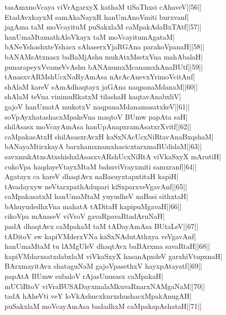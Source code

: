 \documentclass{article}
\begin{document}
tasAmxnoVcaya viVrAgarxyX kathaM tiSaThxsi cAhaveV||56||\\
EtadAvxkayxM samAkaNayxR hanUmAnoVmiti burxvanf|\\
jagAma taM moVcayituM puSakxlaM caMpakAdaBxTAtf||57||\\
hanUmaMtamathAloVkayx taM moVcayitumAgataM|\\
bANeYshashxteYshacx sAhaserxYjaRGAna parakoVpanaH||58||\\
bANAMsAtxnasx baBaMjAshu mukAtxMsetxVna mahAbalaH|\\
punarapeyxVvameVvAshu bANAnumxMcanamxhAnaBUtf||59||\\
tAnasxvARMshUcxNaRyAmAsa nArAcAnevxYrimoVcitAnf|\\
shAlaM kareV sAmAdhaqtayx jaGAna naqpanaMdanaM||60||\\
shAlaM teVna vinimuRkatxM tilashaH kaqtavAnabxliV|\\
gajoV hanUmatA mukotxV naqpanaMdanamasatxkeV||61||\\
soVpAyxhatashacxMpakeVna maqtoV BUmw papAta saH|\\
shilAsasx moVcayAmAsa hanUpAnapxramAsatxrXvitf||62||\\
caMpakasAtxH shilAsasxrAvxH kaSxNAcUcxNiRtavAnaBxqshaM|\\
bANayaMtirxkayA barxhamxnamxhacicxtarxmaBUdidaM||63||\\
savxmukAtxsAtxshishxlAsasxvARshUcxNiRtA viVkaSxyX mArutiH|\\
cukoVpa haqdayeVtayxMtaM bahuviVrayxmiti samxranf||64||\\
Agatayx ca kareV dhaqtAvx naBasuyxtapxtitaH kapiH|\\
tAvadayxyw neVtarxpathAdupari kiSxparxveVgavAnf||65||\\
caMpakasatxM hanUmaMtaM yuyudheV naBasi sithxtaH|\\
bAhuyudedhxVna mahatA tADitaH kapipuMgavaH||66||\\
cikoVpa mAnaseV viVroV gavaRpavaRtadAruNaH|\\
padA dhaqtAvx caMpakaM taM tADayAmAsa BUtaLeV||67||\\
tADitoV sw kapiVMderxVNa kaSxNAdutAthxya veVgavAnf|\\
hanUmaMtaM tu lAMgUleV dhaqtAvx baBArxma savaRtaH||68||\\
kapiVMdarxsatxdabxlaM viVkaSxyX hasanApxdeV garxhiVtupxnaH|\\
BArxmayitAvx shataguNaM gajoVpasethxV hayxpAtayatf||69||\\
papAtA BUmw subaloV rAjasUnusasx caMpakaH|\\
mUCiRtoV viVraBUSADayxmalaMkuvaRnarxNAMgaNaM||70||\\
tadA hAheVti veY loVkAshucxkurxshushacxMpakAnugAH|\\
puSakxlaM moVcayAmAsa badadhxM caMpakapAshataH||71||\\
\end{document}
